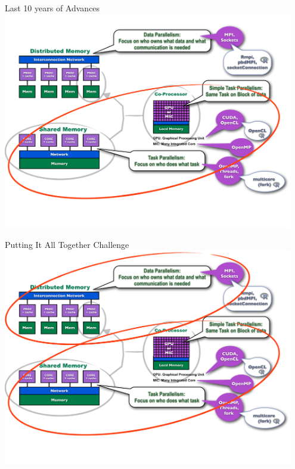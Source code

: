\begin{frame}
\begin{block}{Last 10 years of Advances}
    \includegraphics[width=0.95\textwidth]{pics/ParallelHardware9.pdf}
\end{block}
\end{frame}

\begin{frame}
\begin{block}{Putting It All Together Challenge}
    \includegraphics[width=0.95\textwidth]{pics/ParallelHardware10.pdf}
\end{block}
\end{frame}

